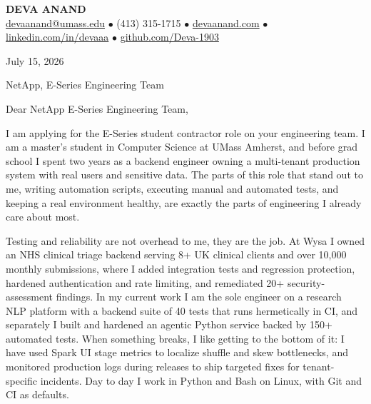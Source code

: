 \documentclass[letterpaper,11pt]{article}
\begin{document}
\begin{center}
    {\fontsize{18}{20}\selectfont\bfseries DEVA ANAND}\\ \vspace{3pt}
    {\small
    \href{mailto:devaanand@umass.edu}{devaanand@umass.edu}
    \enspace$\bullet$\enspace
    (413) 315-1715
    \enspace$\bullet$\enspace
    \href{https://devaanand.com}{devaanand.com}
    \enspace$\bullet$\enspace
    \href{https://linkedin.com/in/devaaa/}{linkedin.com/in/devaaa}
    \enspace$\bullet$\enspace
    \href{https://github.com/Deva-1903}{github.com/Deva-1903}}
\end{center}
\vspace{6pt}

July 15, 2026

\vspace{2pt}

NetApp, E-Series Engineering Team

\vspace{6pt}

Dear NetApp E-Series Engineering Team,

I am applying for the E-Series student contractor role on your engineering team. I am a master's student in Computer Science at UMass Amherst, and before grad school I spent two years as a backend engineer owning a multi-tenant production system with real users and sensitive data. The parts of this role that stand out to me, writing automation scripts, executing manual and automated tests, and keeping a real environment healthy, are exactly the parts of engineering I already care about most.

Testing and reliability are not overhead to me, they are the job. At Wysa I owned an NHS clinical triage backend serving 8+ UK clinical clients and over 10,000 monthly submissions, where I added integration tests and regression protection, hardened authentication and rate limiting, and remediated 20+ security-assessment findings. In my current work I am the sole engineer on a research NLP platform with a backend suite of 40 tests that runs hermetically in CI, and separately I built and hardened an agentic Python service backed by 150+ automated tests. When something breaks, I like getting to the bottom of it: I have used Spark UI stage metrics to localize shuffle and skew bottlenecks, and monitored production logs during releases to ship targeted fixes for tenant-specific incidents. Day to day I work in Python and Bash on Linux, with Git and CI as defaults.
\end{document}
